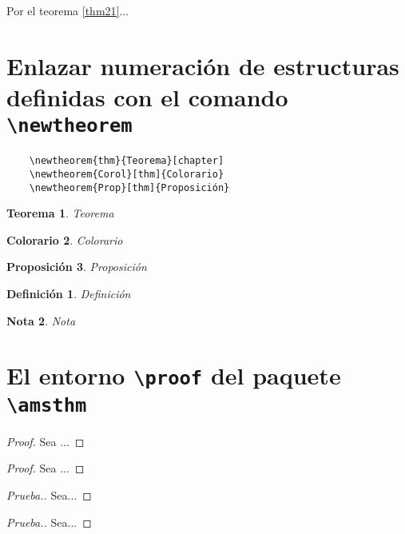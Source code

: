 \documentclass[12pt]{book}
\newcounter{Teorema}
\numberwithin{equation}{section}
\theoremstyle{plain}  %
\newtheorem{thm}{Teorema}[section]
\newtheorem{Corol}[thm]{Colorario}
\newtheorem{Prop}[thm]{Proposición}
\newtheorem{Def}{Definición}[chapter]
\newtheorem{nota}[Def]{Nota}
\begin{document}
Por el teorema  \eqref{thm21}...

\section{Enlazar numeración de estructuras definidas con el comando \texttt{\textbackslash newtheorem}}

\begin{verbatim}
	\newtheorem{thm}{Teorema}[chapter]
	\newtheorem{Corol}[thm]{Colorario}
	\newtheorem{Prop}[thm]{Proposición}
\end{verbatim}

\begin{thm}
	Teorema
\end{thm}
\begin{Corol}
	Colorario
\end{Corol}
\begin{Prop}
	Proposición
\end{Prop}

\begin{Def}
	Definición
\end{Def}

\begin{nota}
	Nota
\end{nota}

\section{El entorno \texttt{\textbackslash proof} del paquete \texttt{\textbackslash amsthm}}

\begin{verbatim*}
	\begin{proof}
	Sea ...
	\end{proof}
	
\end{verbatim*}

	\begin{proof}
	Sea ...
\end{proof}


\begin{verbatim*}
	\begin{proof}[Prueba.]
	Sea...
	\end{proof}
\end{verbatim*}

\begin{proof}[Prueba.]
	Sea...
\end{proof}
\end{document}
